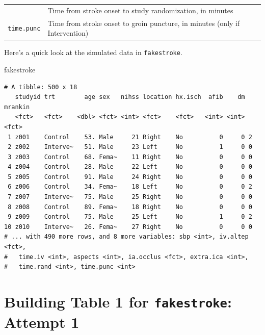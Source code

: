 \documentclass[]{book}
\newenvironment{Shaded}{\begin{snugshade}}{\end{snugshade}}
\newcommand{\NormalTok}[1]{#1}
\theoremstyle{definition}
\theoremstyle{definition}
\theoremstyle{definition}
\theoremstyle{remark}
\begin{document}
\begin{longtable}[]{@{}rl@{}}
\begin{minipage}[t]{0.16\columnwidth}
\end{minipage} & \begin{minipage}[t]{0.55\columnwidth}\raggedright\strut
Time from stroke onset to study randomization, in minutes\strut
\end{minipage}\tabularnewline
\begin{minipage}[t]{0.16\columnwidth}\raggedleft\strut
\texttt{time.punc}\strut
\end{minipage} & \begin{minipage}[t]{0.55\columnwidth}\raggedright\strut
Time from stroke onset to groin puncture, in minutes (only if
Intervention)\strut
\end{minipage}\tabularnewline
\bottomrule
\end{longtable}

Here's a quick look at the simulated data in \texttt{fakestroke}.

\begin{Shaded}
\begin{Highlighting}[]
\NormalTok{fakestroke}
\end{Highlighting}
\end{Shaded}

\begin{verbatim}
# A tibble: 500 x 18
   studyid trt        age sex   nihss location hx.isch  afib    dm mrankin
   <fct>   <fct>    <dbl> <fct> <int> <fct>    <fct>   <int> <int> <fct>  
 1 z001    Control    53. Male     21 Right    No          0     0 2      
 2 z002    Interve~   51. Male     23 Left     No          1     0 0      
 3 z003    Control    68. Fema~    11 Right    No          0     0 0      
 4 z004    Control    28. Male     22 Left     No          0     0 0      
 5 z005    Control    91. Male     24 Right    No          0     0 0      
 6 z006    Control    34. Fema~    18 Left     No          0     0 2      
 7 z007    Interve~   75. Male     25 Right    No          0     0 0      
 8 z008    Control    89. Fema~    18 Right    No          0     0 0      
 9 z009    Control    75. Male     25 Left     No          1     0 2      
10 z010    Interve~   26. Fema~    27 Right    No          0     0 0      
# ... with 490 more rows, and 8 more variables: sbp <int>, iv.altep <fct>,
#   time.iv <int>, aspects <int>, ia.occlus <fct>, extra.ica <int>,
#   time.rand <int>, time.punc <int>
\end{verbatim}

\section{\texorpdfstring{Building Table 1 for \texttt{fakestroke}:
Attempt
1}{Building Table 1 for fakestroke: Attempt 1}}\label{building-table-1-for-fakestroke-attempt-1}
\end{document}
